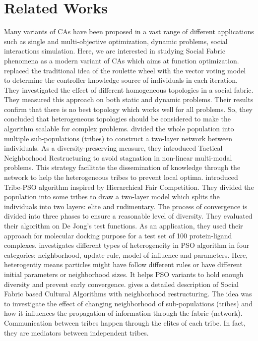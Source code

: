 \documentclass[letterpaper]{article}
\begin{document}
\section{Related Works}
Many variants of CAs have been proposed in a vast range of different applications such as single and multi-objective optimization, dynamic problems, social interactions simulation. Here, we are interested in studying Social Fabric phenomena as a modern variant of CAs which aims at function optimization. \newline
\cite{ali2011boosting} replaced the traditional idea of the roulette wheel with the vector voting model to determine the controller knowledge source of individuals in each iteration. They investigated the effect of different homogeneous topologies in a social fabric. They measured this approach on both static and dynamic problems. Their results confirm that there is no best topology which works well for all problems. So, they concluded that heterogeneous topologies should be considered to make the algorithm scalable for complex problems.\newline
\cite{ali2012socio} divided the whole population into multiple sub-populations (tribes) to construct a two-layer network between individuals. As a diversity-preserving measure, they introduced Tactical Neighborhood Restructuring to avoid stagnation in non-linear multi-modal problems. This strategy facilitate the dissemination of knowledge through the network to help the heterogeneous tribes to prevent local optima.\newline
\cite{chen2006tribe} introduced Tribe-PSO algorithm inspired by Hierarchical Fair Competition. They divided the population into some tribes to draw a two-layer model which splits the individuals into two layers: elite and rudimentary. The process of convergence is divided into three phases to ensure a reasonable level of diversity. They evaluated their algorithm on De Jong's test functions. As an application, they used their approach for molecular docking purpose for a test set of 100 protein-ligand complexes.
\newline
\cite{de2009heterogeneous} investigates different types of heterogeneity in PSO algorithm in four categories: neighborhood, update rule, model of influence and parameters. Here, heterogentiy means particles might have follow different rules or have different initial parameters or neighborhood sizes. It helps PSO variants to hold enough diversity and prevent early convergence.\newline
\cite{ali2016leveraged} gives a detailed description of Social Fabric based Cultural Algorithms with neighborhood restructuring. The idea was to investigate the effect of changing neighborhood of sub-populations (tribes) and how it influences the propagation of information through the fabric (network). Communication between tribes happen through the elites of each tribe. In fact, they are mediators between independent tribes.
\end{document}
